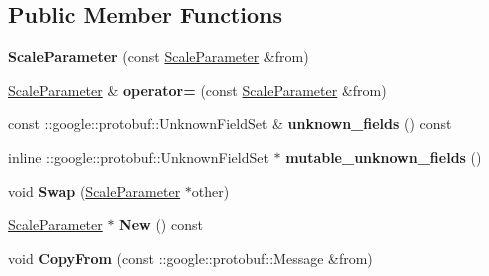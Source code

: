 \subsection*{Public Member Functions}
\begin{DoxyCompactItemize}
\item 
\mbox{\label{classcaffe_1_1_scale_parameter_adae76e849244ba5cf055817451c5de7e}} 
{\bfseries Scale\+Parameter} (const \mbox{\hyperlink{classcaffe_1_1_scale_parameter}{Scale\+Parameter}} \&from)
\item 
\mbox{\label{classcaffe_1_1_scale_parameter_a9d88112323d6f869ce17a7ff4d7bc672}} 
\mbox{\hyperlink{classcaffe_1_1_scale_parameter}{Scale\+Parameter}} \& {\bfseries operator=} (const \mbox{\hyperlink{classcaffe_1_1_scale_parameter}{Scale\+Parameter}} \&from)
\item 
\mbox{\label{classcaffe_1_1_scale_parameter_a8a1df1b4ac305494e145fe280e4a786f}} 
const \+::google\+::protobuf\+::\+Unknown\+Field\+Set \& {\bfseries unknown\+\_\+fields} () const
\item 
\mbox{\label{classcaffe_1_1_scale_parameter_a90f131a391fac8366b915a7c052d00f9}} 
inline \+::google\+::protobuf\+::\+Unknown\+Field\+Set $\ast$ {\bfseries mutable\+\_\+unknown\+\_\+fields} ()
\item 
\mbox{\label{classcaffe_1_1_scale_parameter_ac52b11df8faa8cd29b5da548a6a58303}} 
void {\bfseries Swap} (\mbox{\hyperlink{classcaffe_1_1_scale_parameter}{Scale\+Parameter}} $\ast$other)
\item 
\mbox{\label{classcaffe_1_1_scale_parameter_a28d519563fafe1a4ddf7c61351cd8e6d}} 
\mbox{\hyperlink{classcaffe_1_1_scale_parameter}{Scale\+Parameter}} $\ast$ {\bfseries New} () const
\item 
\mbox{\label{classcaffe_1_1_scale_parameter_a31ba52c4e6938ae1c5c64b50c1fb340b}} 
void {\bfseries Copy\+From} (const \+::google\+::protobuf\+::\+Message \&from)
\item 
\mbox{\label{classcaffe_1_1_scale_parameter_a6bcd86c367ee2d8cf9c8d33083b34490}} 

\end{DoxyCompactItemize}
